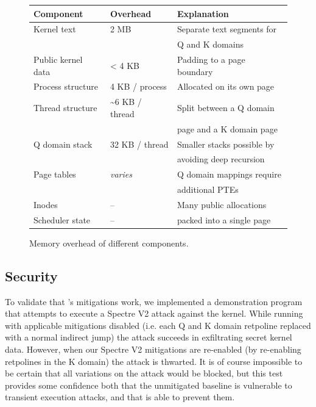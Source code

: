 \begin{figure}[t]
\small
\centering
\begin{tabular}{@{}lll@{}}
  {\bf Component} & {\bf Overhead} & {\bf Explanation} \\
  \midrule
  Kernel text & 2 MB & Separate text segments for \\ && \quad Q and K domains \\
  Public kernel data & < 4 KB & Padding to a page boundary \\
  Process structure & 4 KB / process & Allocated on its own page \\
  Thread structure & \textasciitilde 6 KB / thread & Split between a Q domain \\ && \quad page and a K domain page \\
  Q domain stack & 32 KB / thread & Smaller stacks possible by \\ && \quad avoiding deep recursion \\
  Page tables & \textit{varies} & Q domain mappings require \\ && \quad additional PTEs \\
  Inodes & -- & Many public allocations \\
  Scheduler state & -- & \quad packed into a single page \\
\end{tabular}
\caption{Memory overhead of different \sys components.}
\label{fig:memoverhead}
\end{figure}

\subsection{Security}
\label{ss:secure}


To validate that \sys's mitigations work, we implemented a demonstration
program that attempts to execute a Spectre V2 attack against the \sys kernel.
While running with applicable mitigations disabled (i.e. each Q and K domain
retpoline replaced with a normal indirect jump) the attack succeeds in
exfiltrating secret kernel data. However, when our Spectre V2 mitigations are
re-enabled (by re-enabling retpolines in the K domain) the attack is thwarted.
It is of course impossible to be certain that all variations on the attack
would be blocked, but this test provides some confidence both that the unmitigated
baseline is vulnerable to transient execution attacks, and that \sys is able to prevent
them.


